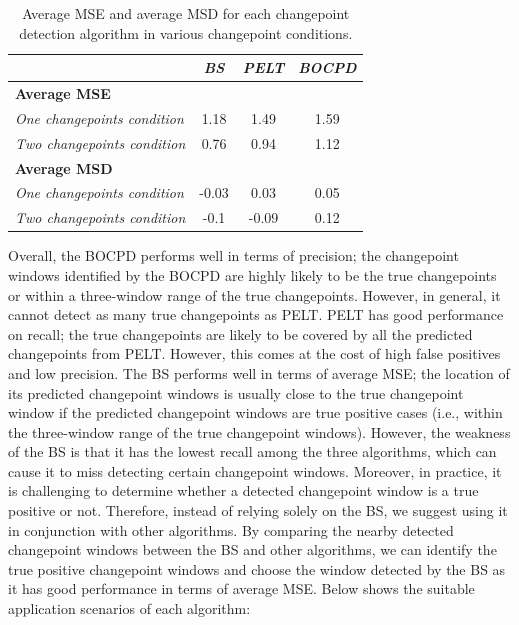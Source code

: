 \documentclass[]{interact}
\theoremstyle{plain}%
\theoremstyle{definition}
\theoremstyle{remark}
\begin{document}
    \begin{table}[H]
    	\centering
    	\renewcommand{\arraystretch}{1.2} %
    	\small
    	\caption{Average MSE and average MSD for each changepoint detection algorithm in various changepoint conditions.}
    	\begin{tabular}{lccc}
    		\hline
    		& \textit{BS} & \textit{PELT} & \textit{BOCPD} \\ \hline
    		\textbf{Average MSE}               &             &               &                \\
    		\textit{One changepoints condition} & 1.18        & 1.49          & 1.59           \\
    		\textit{Two changepoints condition} & 0.76        & 0.94          & 1.12           \\
    		\textbf{Average MSD}               &             &               &                \\
    		\textit{One changepoints condition} & -0.03       & 0.03          & 0.05           \\
    		\textit{Two changepoints condition} & -0.1        & -0.09          & 0.12          \\ \hline
    	\end{tabular}
    	\label{Avg_MSEMSD}
    \end{table}

    Overall, the BOCPD performs well in terms of precision; the changepoint windows identified by the BOCPD are highly likely to be the true changepoints or within a three-window range of the true changepoints. However, in general, it cannot detect as many true changepoints as PELT. PELT has good performance on recall; the true changepoints are likely to be covered by all the predicted changepoints from PELT. However, this comes at the cost of high false positives and low precision. The BS performs well in terms of average MSE; the location of its predicted changepoint windows is usually close to the true changepoint window if the predicted changepoint windows are true positive cases (i.e., within the three-window range of the true changepoint windows). However, the weakness of the BS is that it has the lowest recall among the three algorithms, which can cause it to miss detecting certain changepoint windows. Moreover, in practice, it is challenging to determine whether a detected changepoint window is a true positive or not. Therefore, instead of relying solely on the BS, we suggest using it in conjunction with other algorithms. By comparing the nearby detected changepoint windows between the BS and other algorithms, we can identify the true positive changepoint windows and choose the window detected by the BS as it has good performance in terms of average MSE. Below shows the suitable application scenarios of each algorithm:
    
\end{document}
